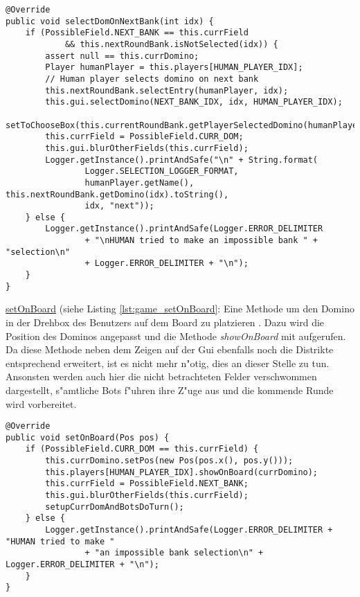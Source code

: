 \begin{lstlisting}[float,style=CodeHighlighting,caption=Game - selectDomOnNextBank,label=game_selectDomOnNextBank]
@Override
public void selectDomOnNextBank(int idx) {
    if (PossibleField.NEXT_BANK == this.currField 
    		&& this.nextRoundBank.isNotSelected(idx)) {
        assert null == this.currDomino;
        Player humanPlayer = this.players[HUMAN_PLAYER_IDX];
        // Human player selects domino on next bank
        this.nextRoundBank.selectEntry(humanPlayer, idx);
        this.gui.selectDomino(NEXT_BANK_IDX, idx, HUMAN_PLAYER_IDX);
        setToChooseBox(this.currentRoundBank.getPlayerSelectedDomino(humanPlayer));
        this.currField = PossibleField.CURR_DOM;
        this.gui.blurOtherFields(this.currField);
        Logger.getInstance().printAndSafe("\n" + String.format(
        		Logger.SELECTION_LOGGER_FORMAT,
                humanPlayer.getName(), this.nextRoundBank.getDomino(idx).toString(),
                idx, "next"));
    } else {
        Logger.getInstance().printAndSafe(Logger.ERROR_DELIMITER
                + "\nHUMAN tried to make an impossible bank " + "selection\n" 
                + Logger.ERROR_DELIMITER + "\n");
    }
}
\end{lstlisting}

\underline{setOnBoard} (siehe Listing \ref{lst:game_setOnBoard}: Eine Methode um den Domino in der Drehbox des Benutzers auf dem Board zu platzieren . Dazu wird die Position des Dominos angepasst und die Methode \emph{showOnBoard} mit aufgerufen. Da diese Methode neben dem Zeigen auf der Gui ebenfalls noch die Distrikte entsprechend erweitert, ist es nicht mehr n"otig, dies an dieser Stelle zu tun. Ansonsten werden auch hier die nicht betrachteten Felder verschwommen dargestellt, s"amtliche Bots f"uhren ihre Z"uge aus und die kommende Runde wird vorbereitet. 

\begin{lstlisting}[float,style=CodeHighlighting,caption=Game - setOnBoard,label=lst:game_setOnBoard]
@Override
public void setOnBoard(Pos pos) {
    if (PossibleField.CURR_DOM == this.currField) {
        this.currDomino.setPos(new Pos(pos.x(), pos.y()));
        this.players[HUMAN_PLAYER_IDX].showOnBoard(currDomino);
        this.currField = PossibleField.NEXT_BANK;
        this.gui.blurOtherFields(this.currField);
        setupCurrDomAndBotsDoTurn();
    } else {
        Logger.getInstance().printAndSafe(Logger.ERROR_DELIMITER + "HUMAN tried to make "
        		+ "an impossible bank selection\n" + Logger.ERROR_DELIMITER + "\n");
    }
}
\end{lstlisting}

